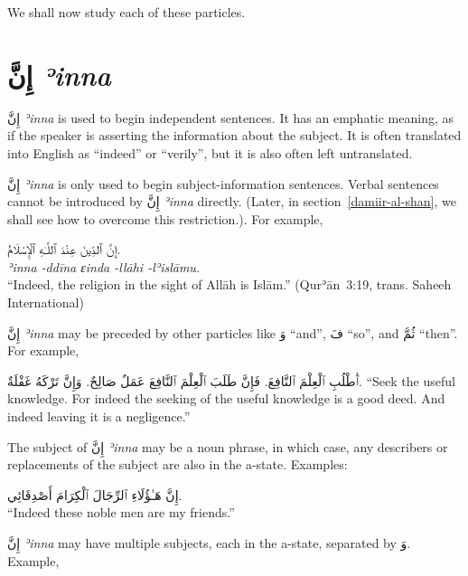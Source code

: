 \documentclass[
  10pt,
]{book}
\begin{document}
We shall now study each of these particles.

\section{\texorpdfstring{\foreignlanguage{arabic}{إِنَّ} \emph{ʾinna}}{إِنَّ ʾinna}}\label{ux625ux646-einna}

\foreignlanguage{arabic}{إِنَّ} \emph{ʾinna} is used to begin independent sentences. It has an emphatic meaning, as if the speaker is asserting the information about the subject. It is often translated into English as \enquote{indeed} or \enquote{verily}, but it is also often left untranslated.

\foreignlanguage{arabic}{إِنَّ} \emph{ʾinna} is only used to begin subject-information sentences. Verbal sentences cannot be introduced by \foreignlanguage{arabic}{إِنَّ} \emph{ʾinna} directly. (Later, in section~\ref{damiir-al-shan}, we shall see how to overcome this restriction.). For example,

\foreignlanguage{arabic}{إِنَّ ٱلدِّينَ عِنْدَ ٱللَّـٰهِ ٱلْإِسْلَامُ.}\\
\emph{ʾinna -ddīna ɛinda -llāhi -lʾislāmu.}\\
\enquote{Indeed, the religion in the sight of Allāh is Islām.} (Qurʾān~3:19, trans. Saheeh International)

\foreignlanguage{arabic}{إِنَّ} \emph{ʾinna}
may be preceded by other particles like \foreignlanguage{arabic}{وَ} \enquote{and}, \foreignlanguage{arabic}{فَ} \enquote{so}, and \foreignlanguage{arabic}{ثُمَّ} \enquote{then}. For example,

\foreignlanguage{arabic}{ٱُطْلُبِ ٱلْعِلْمَ ٱلنَّافِعَ. فَإِنَّ طَلَبَ ٱلْعِلْمَ ٱلنَّافِعَ عَمَلٌ صَالِحٌ. وَإِنَّ تَرْکَهُ غَفْلَةٌ.}
\enquote{Seek the useful knowledge. For indeed the seeking of the useful knowledge is a good deed. And indeed leaving it is a negligence.}

The subject of
\foreignlanguage{arabic}{إِنَّ} \emph{ʾinna}
may be a noun phrase, in which case, any describers or replacements of the subject are also in the a-state. Examples:

\foreignlanguage{arabic}{إِنَّ هَـٰؤُلَاءِ ٱلرِّجَالَ ٱلْکِرَامَ أَصْدِقَائِي.}\\
\enquote{Indeed these noble men are my friends.}

\foreignlanguage{arabic}{إِنَّ} \emph{ʾinna} may have multiple subjects, each in the a-state, separated by \foreignlanguage{arabic}{وَ}. Example,
\end{document}
